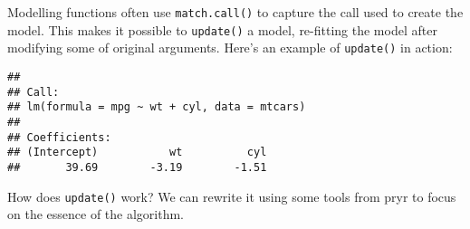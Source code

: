 Modelling functions often use \texttt{match.call()} to capture the call
used to create the model. This makes it possible to \texttt{update()} a
model, re-fitting the model after modifying some of original arguments.
Here's an example of \texttt{update()} in action: 

\begin{Shaded}
\begin{Highlighting}[]
\StringTok{ }\OperatorTok{~}\StringTok{ }
\OperatorTok{~}\StringTok{ }\OperatorTok{+}\StringTok{ }
\end{Highlighting}
\end{Shaded}

\begin{verbatim}
## 
## Call:
## lm(formula = mpg ~ wt + cyl, data = mtcars)
## 
## Coefficients:
## (Intercept)           wt          cyl  
##       39.69        -3.19        -1.51
\end{verbatim}

How does \texttt{update()} work? We can rewrite it using some tools from
pryr to focus on the essence of the algorithm.

\begin{Shaded}
\begin{Highlighting}[]
\StringTok{ }
\StringTok{ }\OperatorTok{$}

  \NormalTok{ (}\OperatorTok{!}
\OperatorTok{$}\StringTok{ }\NormalTok{(}
\NormalTok{  \}}

\NormalTok{\}}
\StringTok{ }
\StringTok{ }
  \NormalTok{())}
\NormalTok{\}}
\OperatorTok{~}\StringTok{ }\OperatorTok{+}\StringTok{ }
\end{Highlighting}
\end{Shaded}

